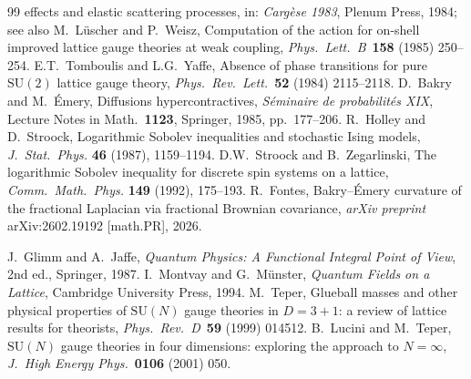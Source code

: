 \documentclass[11pt]{article}
\theoremstyle{definition}
\newcommand{\SU}{\mathrm{SU}}
\begin{document}
\begin{thebibliography}{99}
effects and elastic scattering processes, in: \emph{Carg\`ese 1983},
Plenum Press, 1984; see also M.~L\"uscher and P.~Weisz, Computation
of the action for on-shell improved lattice gauge theories at weak
coupling, \emph{Phys.\ Lett.\ B}\ \textbf{158} (1985) 250--254.
 E.T.~Tomboulis and L.G.~Yaffe, Absence of phase
transitions for pure $\SU(2)$ lattice gauge theory,
\emph{Phys.\ Rev.\ Lett.}\ \textbf{52} (1984) 2115--2118.
 D.~Bakry and M.~\'Emery, Diffusions
hypercontractives, \emph{S\'eminaire de probabilit\'es XIX},
Lecture Notes in Math.\ \textbf{1123}, Springer, 1985, pp.~177--206.
 R.~Holley and D.~Stroock, Logarithmic Sobolev
inequalities and stochastic Ising models, \textit{J.\ Stat.\ Phys.}
\textbf{46} (1987), 1159--1194.
 D.W.~Stroock and B.~Zegarlinski,
The logarithmic Sobolev inequality for discrete spin systems on a
lattice, \textit{Comm.\ Math.\ Phys.} \textbf{149} (1992), 175--193.
 R.~Fontes, Bakry--\'Emery curvature of the
fractional Laplacian via fractional Brownian covariance,
\textit{arXiv preprint} arXiv:2602.19192 [math.PR], 2026.

 J.~Glimm and A.~Jaffe,
\textit{Quantum Physics: A Functional Integral Point of View},
2nd ed., Springer, 1987.
 I.~Montvay and G.~M\"unster,
\textit{Quantum Fields on a Lattice}, Cambridge University Press, 1994.
 M.~Teper, Glueball masses and other physical
properties of $\SU(N)$ gauge theories in $D=3+1$: a review of
lattice results for theorists,
\textit{Phys.\ Rev.\ D}\ \textbf{59} (1999) 014512.
 B.~Lucini and M.~Teper, $\SU(N)$ gauge theories
in four dimensions: exploring the approach to $N=\infty$,
\textit{J.\ High Energy Phys.}\ \textbf{0106} (2001) 050.
\end{thebibliography}
\end{document}

